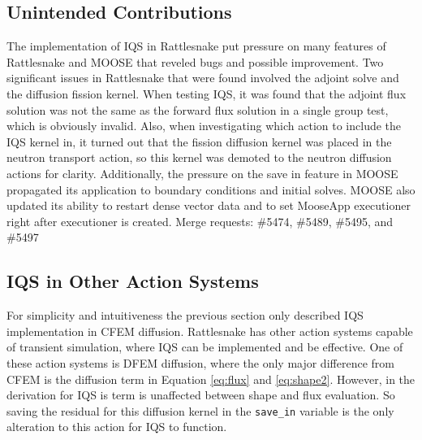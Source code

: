 \documentclass[10pt]{scrartcl}
\begin{document}
\subsection{Unintended Contributions}
The implementation of IQS in Rattlesnake put pressure on many features of Rattlesnake and MOOSE that reveled bugs and possible improvement.  Two significant issues in Rattlesnake that were found involved the adjoint solve and the diffusion fission kernel.  When testing IQS, it was found that the adjoint flux solution was not the same as the forward flux solution in a single group test, which is obviously invalid.  Also, when investigating which action to include the IQS kernel in, it turned out that the fission diffusion kernel was placed in the neutron transport action, so this kernel was demoted to the neutron diffusion actions for clarity.  Additionally, the pressure on the save in feature in MOOSE propagated its application to boundary conditions and initial solves.  MOOSE also updated its ability to restart dense vector data and to set MooseApp executioner right after executioner is created.  Merge requests: \#5474, \#5489, \#5495, and \#5497

\subsection{IQS in Other Action Systems}

For simplicity and intuitiveness the previous section only described IQS implementation in CFEM diffusion.  Rattlesnake has other action systems capable of transient simulation, where IQS can be implemented and be effective.  One of these action systems is DFEM diffusion, where the only major difference from CFEM is the diffusion term in Equation \ref{eq:flux} and \ref{eq:shape2}.  However, in the derivation for IQS is term is unaffected between shape and flux evaluation.  So saving the residual for this diffusion kernel in the \texttt{save\_in} variable is the only alteration to this action for IQS to function. \\
\end{document}
